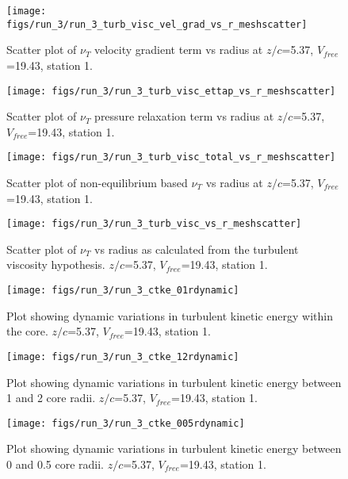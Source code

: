 \begin{figure}[H]
\centering
\texttt{[image: figs/run\_3/run\_3\_turb\_visc\_vel\_grad\_vs\_r\_meshscatter]}
\caption{Scatter plot of $\nu_T$ velocity gradient term vs radius at $z/c$=5.37, $V_{free}$=19.43, station 1.}
\end{figure}


\begin{figure}[H]
\centering
\texttt{[image: figs/run\_3/run\_3\_turb\_visc\_ettap\_vs\_r\_meshscatter]}
\caption{Scatter plot of $\nu_T$ pressure relaxation term vs radius at $z/c$=5.37, $V_{free}$=19.43, station 1.}
\end{figure}


\begin{figure}[H]
\centering
\texttt{[image: figs/run\_3/run\_3\_turb\_visc\_total\_vs\_r\_meshscatter]}
\caption{Scatter plot of non-equilibrium based $\nu_T$ vs radius at $z/c$=5.37, $V_{free}$=19.43, station 1.}
\end{figure}


\begin{figure}[H]
\centering
\texttt{[image: figs/run\_3/run\_3\_turb\_visc\_vs\_r\_meshscatter]}
\caption{Scatter plot of $\nu_T$ vs radius as calculated from the turbulent viscosity hypothesis. $z/c$=5.37, $V_{free}$=19.43, station 1.}
\end{figure}


\begin{figure}[H]
\centering
\texttt{[image: figs/run\_3/run\_3\_ctke\_01rdynamic]}
\caption{Plot showing dynamic variations in turbulent kinetic energy within the core. $z/c$=5.37, $V_{free}$=19.43, station 1.}
\end{figure}


\begin{figure}[H]
\centering
\texttt{[image: figs/run\_3/run\_3\_ctke\_12rdynamic]}
\caption{Plot showing dynamic variations in turbulent kinetic energy between 1 and 2 core radii. $z/c$=5.37, $V_{free}$=19.43, station 1.}
\end{figure}


\begin{figure}[H]
\centering
\texttt{[image: figs/run\_3/run\_3\_ctke\_005rdynamic]}
\caption{Plot showing dynamic variations in turbulent kinetic energy between 0 and 0.5 core radii. $z/c$=5.37, $V_{free}$=19.43, station 1.}
\end{figure}


